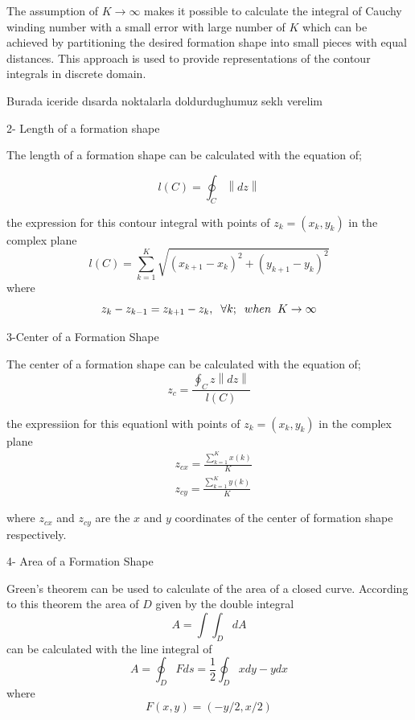 \documentclass[twoside]{article}
\newcommand{\norm}[1]{\left\lVert#1\right\rVert}
\begin{document}
		
The assumption of $K \to\infty$ makes it possible to calculate the integral of Cauchy winding number with a small error with large number of $K$ which can be achieved by partitioning the desired formation shape  into small pieces with equal  distances. This approach is used to provide representations of the contour integrals in discrete domain. 

Burada iceride dısarda noktalarla doldurdughumuz seklı verelim
		
		2- Length of a formation shape
		
		The length of a formation shape can be calculated with the equation of;
		
		\begin{equation}
       l(C)= \oint_C \norm{dz}
		\end{equation}
		
		the expression for this contour integral with points of   $z_k = (x_k,y_k)$ in the complex plane
		\begin{equation}
l(C) = \sum_{k=1}^{K}\sqrt{(x_{k+1} - x_k)^2 + (y_{k+1} - y_k)^2}
		\end{equation}
				where
				\begin{equation}
				z_k - z_{k-1} = z_{k+1} - z_k, \hspace{0.2cm}  \forall k ;  \hspace{0.2cm} when  \hspace{0.2cm} K \to\infty
				\end{equation}
		
		3-Center of a Formation Shape
		
	The center of a formation shape can be calculated with the equation of;
	\begin{equation}
 z_c = \frac{\oint_C z\norm{dz}}{l(C)}
	\end{equation}
		
				the expressiion for this equationl with points of  $z_k = (x_k,y_k)$ in the complex plane
				\begin{align*}
&z_{cx} = \frac{\sum_{k=1}^{K}x(k)}{K}  \\
&z_{cy} = \frac{\sum_{k=1}^{K}y(k)}{K}  
				\end{align*}
		
		where $z_{cx}$ and $z_{cy}$ are the $x$ and $y$ coordinates of the center of formation shape respectively.
		
		4- Area of a Formation Shape
		
		Green's theorem can be used to calculate of the area of a closed curve. According to this theorem the area of $D$ given by the double integral
		\begin{equation}
 A = \int\int_D dA
		\end{equation}
		can be calculated with the line integral of
		\begin{equation}
 A = \oint_D F ds = \frac{1}{2} \oint_D xdy - ydx
		\end{equation}
where
\begin{equation}
F(x,y) = (-y/2,x/2)
\end{equation}
		
\end{document}
